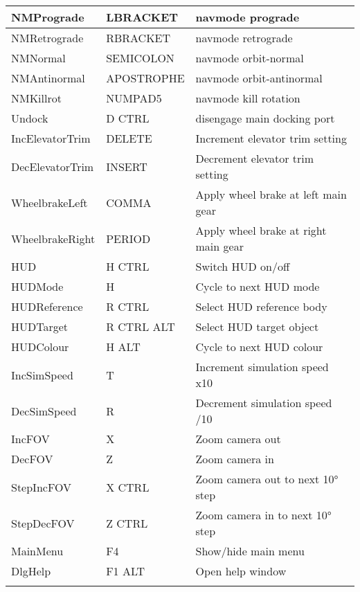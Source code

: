\documentclass[Orbiter User Manual.tex]{subfiles}
\begin{document}
\begin{longtable}{ |p{}|p{}|p{}| }
	\hline\rule{0pt}{2ex}
	NMPrograde & LBRACKET & navmode prograde\\
	\hline\rule{0pt}{2ex}
	NMRetrograde & RBRACKET & navmode retrograde\\
	\hline\rule{0pt}{2ex}
	NMNormal & SEMICOLON & navmode orbit-normal\\
	\hline\rule{0pt}{2ex}
	NMAntinormal & APOSTROPHE & navmode orbit-antinormal\\
	\hline\rule{0pt}{2ex}
	NMKillrot & NUMPAD5 & navmode kill rotation\\
	\hline\rule{0pt}{2ex}
	Undock & D CTRL & disengage main docking port\\
	\hline\rule{0pt}{2ex}
	IncElevatorTrim & DELETE & Increment elevator trim setting\\
	\hline\rule{0pt}{2ex}
	DecElevatorTrim & INSERT & Decrement elevator trim setting\\
	\hline\rule{0pt}{2ex}
	WheelbrakeLeft & COMMA & Apply wheel brake at left main gear\\
	\hline\rule{0pt}{2ex}
	WheelbrakeRight & PERIOD & Apply wheel brake at right main gear\\
	\hline\rule{0pt}{2ex}
	HUD & H CTRL & Switch HUD on/off\\
	\hline\rule{0pt}{2ex}
	HUDMode & H & Cycle to next HUD mode\\
	\hline\rule{0pt}{2ex}
	HUDReference & R CTRL & Select HUD reference body\\
	\hline\rule{0pt}{2ex}
	HUDTarget & R CTRL ALT & Select HUD target object\\
	\hline\rule{0pt}{2ex}
	HUDColour & H ALT & Cycle to next HUD colour\\
	\hline\rule{0pt}{2ex}
	IncSimSpeed & T & Increment simulation speed x10\\
	\hline\rule{0pt}{2ex}
	DecSimSpeed & R & Decrement simulation speed /10\\
	\hline\rule{0pt}{2ex}
	IncFOV & X & Zoom camera out\\
	\hline\rule{0pt}{2ex}
	DecFOV & Z & Zoom camera in\\
	\hline\rule{0pt}{2ex}
	StepIncFOV & X CTRL & Zoom camera out to next 10° step\\
	\hline\rule{0pt}{2ex}
	StepDecFOV & Z CTRL & Zoom camera in to next 10° step\\
	\hline\rule{0pt}{2ex}
	MainMenu & F4 & Show/hide main menu\\
	\hline\rule{0pt}{2ex}
	DlgHelp & F1 ALT & Open help window\\
	\hline\rule{0pt}{2ex}

\end{longtable}
\end{document}
